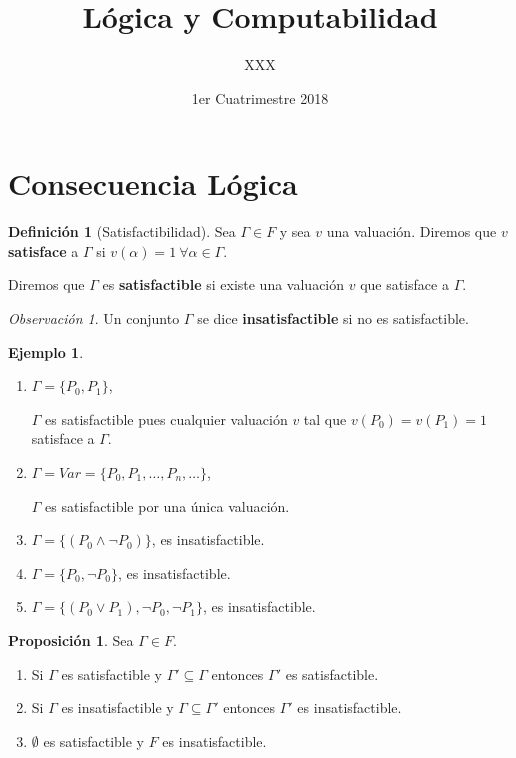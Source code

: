 \documentclass[a4paper,11pt]{article}
\title{Lógica y Computabilidad}
\author{XXX}
\date{1er Cuatrimestre 2018}
\theoremstyle{definition}
\newtheorem{defn}{Definición}[section]
\newtheorem{exap}{Ejemplo}[section]
\newtheorem{prop}{Proposición}[section]
\theoremstyle{remark}
\newtheorem*{remk}{Observación}
\begin{document}
\maketitle

\section{Consecuencia Lógica}

\begin{defn}[Satisfactibilidad]
	Sea $\Gamma \in F$ y sea $v$ una valuación. Diremos que $v$ \textbf{satisface} a $\Gamma$
	si $v(\alpha) = 1\ \forall\alpha \in \Gamma$.
	
	Diremos que $\Gamma$ es \textbf{satisfactible} si existe una valuación $v$ que satisface a $\Gamma$.
\end{defn}

\begin{remk}
	Un conjunto $\Gamma$ se dice \textbf{insatisfactible} si no es satisfactible.
\end{remk}

\begin{exap}
	\begin{enumerate}
		\item $\Gamma = \{P_0, P_1\}$, 
		
		$\Gamma$ es satisfactible pues cualquier valuación $v$
		tal que $v(P_0) = v(P_1) = 1$ satisface a $\Gamma$.
		
		\item $\Gamma = Var = \{P_0, P_1, \dots, P_n, \dots\}$,
		
		$\Gamma$ es satisfactible por una única valuación.
		
		\item $\Gamma = \{(P_0 \wedge \neg P_0)\}$, es insatisfactible.
		
		\item $\Gamma = \{P_0, \neg P_0\}$, es insatisfactible.
		
		\item $\Gamma = \{(P_0 \vee P_1), \neg P_0, \neg P_1\}$, es insatisfactible.
	\end{enumerate}
\end{exap}

\begin{prop}
	Sea $\Gamma \in F$.
	
	\begin{enumerate}
		\item Si $\Gamma$ es satisfactible y $\Gamma' \subseteq \Gamma$ entonces 
		$\Gamma'$ es satisfactible.
		
		\item Si $\Gamma$ es insatisfactible y $\Gamma \subseteq \Gamma'$ entonces 
		$\Gamma'$ es insatisfactible.
		
		\item $\emptyset$ es satisfactible y $F$ es insatisfactible.
	\end{enumerate}
\end{prop}
\end{document}
